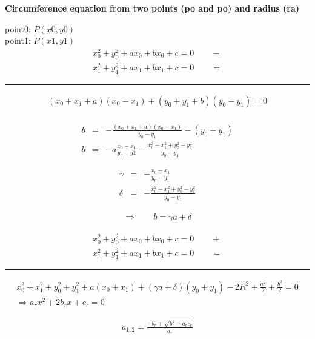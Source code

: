 \documentclass[14pt]{extarticle}
\begin{document}




\begin{center}
{\bf Circumference equation from two points (po and po) and radius (ra)}
\end{center}

point0: $P(x0, y0)$\\
point1: $P(x1, y1)$\\

\begin{eqnarray}
	x_0^2 + y_0^2 + ax_0 + bx_0 + c = 0\qquad - \\
	x_1^2 + y_1^2 + ax_1 + bx_1 + c = 0\qquad =
\end{eqnarray}

\hrule

\begin{eqnarray}
	\left(x_0 + x_1 + a\right)\left(x_0 - x_1\right) + \left( y_0 + y_1 + b\right)\left(y_0 - y_1\right) = 0\\
\end{eqnarray}

\begin{eqnarray}
	b & = & - \frac{\left(x_0 + x_1 + a\right)\left(x_0 - x_1\right)}{y_0 - y_1} - \left(y_0 + y_1\right)\\
	b & = & -a\frac{x_0-x_1}{y_0 - y1} - \frac{x_0^2 -x_1^2 + y_0^2 - y_1^2}{y_0 - y_1}	
\end{eqnarray}

\begin{eqnarray}
	\gamma & = & - \frac{x_0 - x_1}{y_0 - y_1}\\
	\delta & = & -\frac{x_0^2 - x_1^2 + y_0^2 - y_1^2}{y_0 - y_1}
\end{eqnarray}


\begin{eqnarray}
	\Rightarrow\qquad b = \gamma a + \delta
\end{eqnarray}


\newpage



\begin{eqnarray}
	x_0^2 + y_0^2 + ax_0 + bx_0 + c = 0\qquad + \\
	x_1^2 + y_1^2 + ax_1 + bx_1 + c = 0\qquad =
\end{eqnarray}


\hrule

\begin{eqnarray}
	x_0^2 + x_1^2 + y_0^2 + y_1^2 + a(x_0 + x_1) + (\gamma a + \delta)(y_0 + y_1) - 2R^2 + \frac{a^2}{2} + \frac{b^2}{2} = 0\\
	\Rightarrow a_rx^2 + 2b_rx + c_r = 0
\end{eqnarray}

\begin{eqnarray}
	a_{1,2} = \frac{-b_r \pm \sqrt{b_r^2 - a_rc_r}}{a_r}
\end{eqnarray}
\end{document}
